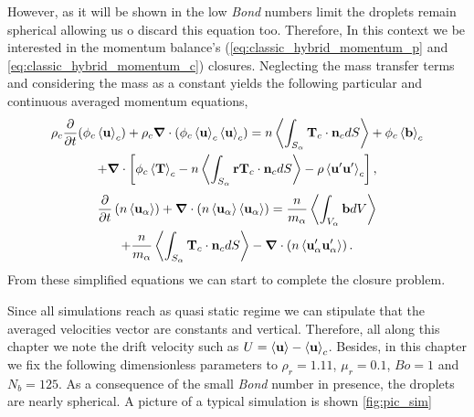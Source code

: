 However, as it will be shown in the low \textit{Bond} numbers limit the droplets remain spherical allowing us o discard this equation too. 
Therefore, In this context we be interested in the momentum balance's (\ref{eq:classic_hybrid_momentum_p} and \ref{eq:classic_hybrid_momentum_c}) closures. 
Neglecting the mass transfer terms and considering the mass as a constant yields the following particular and continuous averaged momentum equations, 
\begin{multline}
    \rho_c\frac{\partial}{\partial t} (\phi_c\left<\textbf{u}\right>_c) 
    + \rho_c\bm{\nabla} \cdot ( \phi_c \left<\textbf{u}\right>_c\left<\textbf{u}\right>_c)
    = n \left<\int_{S_\alpha} \textbf{T}_c  \cdot \textbf{n}_c d S\right>
    +\phi_c\left<\textbf{b}\right>_c\\
    + \bm{\nabla}\cdot\left[
    \phi_c \left<\textbf{T}\right>_c
    - n \left<\int_{S_\alpha} \textbf{r} \textbf{T}_c  \cdot \textbf{n}_c dS\right>
    - \rho \left<\textbf{u}'\textbf{u}'\right>_c
    \right],
    \label{eq:homo_momentum_c}
\end{multline}
\begin{multline}
    \frac{\partial}{\partial t}   \left(n \left<\textbf{u}_\alpha\right>\right)
    + \bm{\nabla} \cdot \left(n \left<\textbf{u}_\alpha\right>\left<\textbf{u}_\alpha\right>\right)
    = \frac{n}{m_\alpha}\left<\int_{V_\alpha} \textbf{b} dV\right>\\
    + \frac{n}{m_\alpha}\left<\int_{S_\alpha} \textbf{T}_c  \cdot \textbf{n}_c dS\right>
    - \bm{\nabla} \cdot \left(n \left<\textbf{u}_\alpha' \textbf{u}_\alpha'\right>\right). 
    \label{eq:homo_momentum_p}
\end{multline}
From these simplified equations we can start to complete the closure problem.

Since all simulations reach as quasi static regime we can stipulate that the averaged velocities vector are constants and vertical. 
Therefore, all along this chapter we note the drift velocity such as $U = \left<\textbf{u}\right> - \left<\textbf{u}\right>_c$. 
Besides, in this chapter we fix the following dimensionless parameters to $\rho_r =1.11 $, $\mu_r =0.1$, $Bo =1$ and $N_b = 125$. 
As a consequence of the small \textit{Bond} number in presence, the droplets are nearly spherical. 
A picture of a typical simulation is shown \ref{fig:pic_sim}